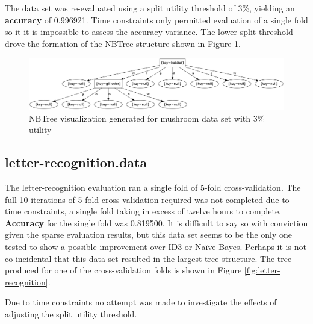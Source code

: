 \documentclass[10pt]{report}
\begin{document}
The data set was re-evaluated using a split utility threshold of 3\%,
yielding an \textbf{accuracy} of 0.996921. Time
constraints only permitted evaluation of a single fold so it it is
impossible to assess the accuracy variance. The lower split threshold drove
the formation of the NBTree structure shown in Figure \ref{fig:mushroom}.

\begin{figure}
  \begin{center}
	\includegraphics[width=\textwidth,height=!]{mushroom}
  \end{center}
  \caption{NBTree visualization generated for mushroom data set with 3\%
    utility }
  \label{fig:mushroom}
\end{figure} 

\subsection*{letter-recognition.data}
The letter-recognition evaluation ran a single fold of 5-fold
cross-validation. The full 10 iterations of 5-fold cross validation
required was not completed due to time constraints, a single fold
taking in excess of twelve hours to complete. \textbf{Accuracy} for
the single fold was 0.819500. It is difficult to say so with
conviction given the sparse evaluation results, but this data set
seems to be the only one tested to show a possible improvement over
ID3 or Na\"{i}ve Bayes. Perhaps it is not co-incidental that this data
set resulted in the largest tree structure. The tree produced for one
of the cross-validation folds is shown in Figure
\ref{fig:letter-recognition}. 

Due to time constraints no attempt was made to investigate the effects
of adjusting the split utility threshold.
\end{document}
